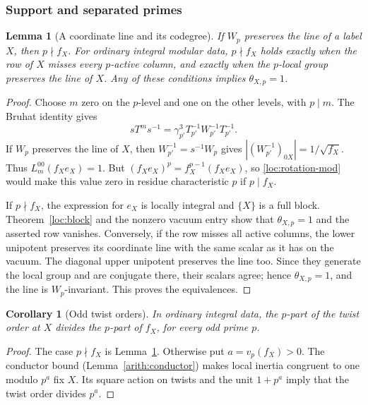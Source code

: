\documentclass[11pt,a4paper]{article}
\numberwithin{equation}{section}
\newtheorem{lemma}[theorem]{Lemma}
\newtheorem{corollary}[theorem]{Corollary}
\begin{document}
\subsubsection{Support and separated primes}

\begin{lemma}[A coordinate line and its codegree]\label{loc:weyl-line}
If $W_p$ preserves the line of a label $X$, then $p\nmid f_X$.
For ordinary integral modular data, $p\nmid f_X$ holds exactly when
the row of $X$ misses every $p$-active column, and exactly when the
$p$-local group preserves the line of $X$.
Any of these conditions implies $\theta_{X,p}=1$.
\end{lemma}
\begin{proof}
Choose $m$ zero on the $p$-level and one on the other levels, with
$p\mid m$. The Bruhat identity gives
\begin{equation}\label{loc:crt-rotation}
 sT^ms^{-1}
       =\gamma_{p'}^3T_{p'}^{-1}W_{p'}^{-1}T_{p'}^{-1}.
\end{equation}
If $W_p$ preserves the line of $X$, then
$W_{p'}^{-1}=s^{-1}W_p$ gives
$|(W_{p'}^{-1})_{0X}|=1/\sqrt{f_X}$.
Thus $L_m^{00}(f_Xe_X)=1$. But
$(f_Xe_X)^p=f_X^{p-1}(f_Xe_X)$, so
\eqref{loc:rotation-mod} would make this value zero in residue
characteristic $p$ if $p\mid f_X$.

If $p\nmid f_X$, the expression for $e_X$ is locally integral and
$\{X\}$ is a full block. Theorem~\ref{loc:block} and the nonzero
vacuum entry show that $\theta_{X,p}=1$ and the asserted row vanishes.
Conversely, if the row misses all active columns, the lower
unipotent preserves its coordinate line with the same scalar as it
has on the vacuum. The diagonal upper unipotent preserves the line
too. Since they generate the local group and are conjugate there,
their scalars agree; hence $\theta_{X,p}=1$, and the line is
$W_p$-invariant. This proves the equivalences.
\end{proof}

\begin{corollary}[Odd twist orders]\label{loc:odd-twist}
In ordinary integral data, the $p$-part of the twist order at $X$
divides the $p$-part of $f_X$, for every odd prime $p$.
\end{corollary}
\begin{proof}
The case $p\nmid f_X$ is Lemma~\ref{loc:weyl-line}. Otherwise put
$a=v_p(f_X)>0$. The conductor bound
(Lemma~\ref{arith:conductor}) makes local inertia congruent to
one modulo $p^a$ fix $X$. Its square action on twists and the unit
$1+p^a$ imply that the twist order divides $p^a$.
\end{proof}
\end{document}
